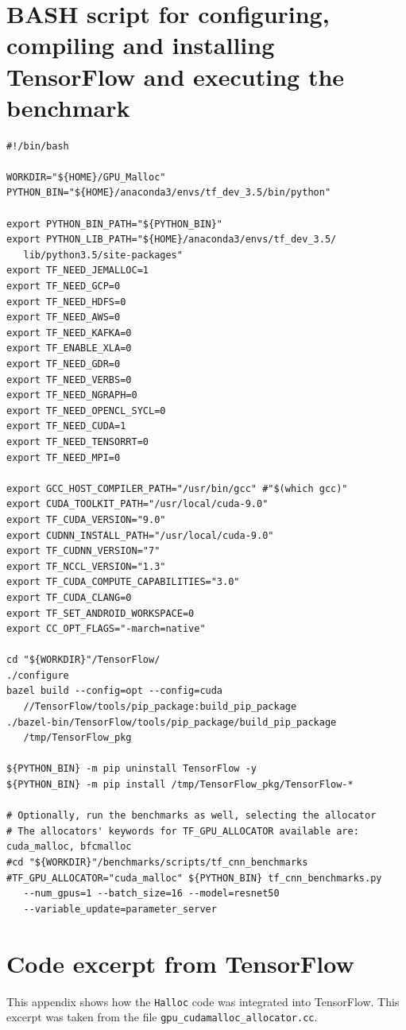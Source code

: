 \documentclass[12pt,twoside]{article}
\begin{document}



\newpage

\appendix
\section{BASH script for configuring, compiling and installing TensorFlow and executing the benchmark}\label{apx:bash-script}

\begin{verbatim}
#!/bin/bash

WORKDIR="${HOME}/GPU_Malloc"
PYTHON_BIN="${HOME}/anaconda3/envs/tf_dev_3.5/bin/python"

export PYTHON_BIN_PATH="${PYTHON_BIN}"
export PYTHON_LIB_PATH="${HOME}/anaconda3/envs/tf_dev_3.5/
   lib/python3.5/site-packages"
export TF_NEED_JEMALLOC=1
export TF_NEED_GCP=0
export TF_NEED_HDFS=0
export TF_NEED_AWS=0
export TF_NEED_KAFKA=0
export TF_ENABLE_XLA=0
export TF_NEED_GDR=0
export TF_NEED_VERBS=0
export TF_NEED_NGRAPH=0
export TF_NEED_OPENCL_SYCL=0
export TF_NEED_CUDA=1
export TF_NEED_TENSORRT=0
export TF_NEED_MPI=0

export GCC_HOST_COMPILER_PATH="/usr/bin/gcc" #"$(which gcc)"
export CUDA_TOOLKIT_PATH="/usr/local/cuda-9.0"
export TF_CUDA_VERSION="9.0"
export CUDNN_INSTALL_PATH="/usr/local/cuda-9.0"
export TF_CUDNN_VERSION="7"
export TF_NCCL_VERSION="1.3"
export TF_CUDA_COMPUTE_CAPABILITIES="3.0"
export TF_CUDA_CLANG=0
export TF_SET_ANDROID_WORKSPACE=0
export CC_OPT_FLAGS="-march=native"

cd "${WORKDIR}"/TensorFlow/
./configure
bazel build --config=opt --config=cuda
   //TensorFlow/tools/pip_package:build_pip_package
./bazel-bin/TensorFlow/tools/pip_package/build_pip_package 
   /tmp/TensorFlow_pkg

${PYTHON_BIN} -m pip uninstall TensorFlow -y
${PYTHON_BIN} -m pip install /tmp/TensorFlow_pkg/TensorFlow-*

# Optionally, run the benchmarks as well, selecting the allocator
# The allocators' keywords for TF_GPU_ALLOCATOR available are: cuda_malloc, bfcmalloc
#cd "${WORKDIR}"/benchmarks/scripts/tf_cnn_benchmarks
#TF_GPU_ALLOCATOR="cuda_malloc" ${PYTHON_BIN} tf_cnn_benchmarks.py
   --num_gpus=1 --batch_size=16 --model=resnet50 
   --variable_update=parameter_server
\end{verbatim}

\section{Code excerpt from TensorFlow}
\label{app:gpu-cudamalloc}
This appendix shows how the \texttt{Halloc} code was integrated into TensorFlow. This excerpt was taken from the file \texttt{gpu\_cudamalloc\_allocator.cc}.
\end{document}
